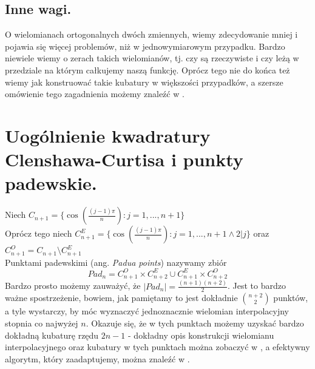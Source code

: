 \documentclass[10pt,wide]{mwart}
\theoremstyle{definition}
\begin{document}
\subsection{Inne wagi.}
O wielomianach ortogonalnych dwóch zmiennych, wiemy zdecydowanie mniej i pojawia się więcej problemów, niż w jednowymiarowym przypadku.
Bardzo niewiele wiemy o zerach takich wielomianów, tj. czy są rzeczywiste i czy leżą w przedziale na którym całkujemy naszą funkcję.
Oprócz tego nie do końca też wiemy jak konstruować takie kubatury w większości przypadków, a szersze omówienie tego zagadnienia możemy znaleźć w \cite{YX2}.
\section{Uogólnienie kwadratury Clenshawa-Curtisa i punkty padewskie.}
Niech \(C_{n+1} = \Big\{ \cos(\frac{(j-1)\pi}{n})  : j=1,...,n+1 \Big\} \) \\
Oprócz tego niech \(C^E_{n+1} = \Big\{ \cos(\frac{(j-1)\pi}{n}) : j=1,...,n+1 \wedge 2 | j\Big\}\)
oraz \(C^O_{n+1} = C_{n+1} \setminus C^E_{n+1}\) \\
Punktami padewskimi (ang. \emph{Padua points}) nazywamy zbiór
\begin{equation*}
  Pad_n = C^O_{n+1} \times C^E_{n+2} \cup C^E_{n+1} \times C^O_{n+2}
\end{equation*}
Bardzo prosto możemy zauważyć, że \(|Pad_n| = \frac{(n+1)(n+2)}{2}\).
Jest to bardzo ważne spostrzeżenie, bowiem, jak pamiętamy to jest dokładnie \(n+2\choose 2\) punktów, a tyle wystarczy, by móc wyznaczyć jednoznacznie wielomian interpolacyjny stopnia co najwyżej \(n\).
Okazuje się, że w tych punktach możemy uzyskać bardzo dokładną kubaturę rzędu \(2n-1\) - dokładny opis konstrukcji wielomianu interpolacyjnego oraz kubatury w tych punktach można zobaczyć w \cite{BMVX},
a efektywny algorytm, który zaadaptujemy, można znaleźć w \cite{CMSV}.
\end{document}
